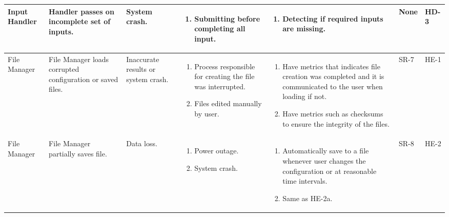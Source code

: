 \documentclass{article}
\begin{document}
\begin{landscape}
\begin{longtable}{|p{} | p{} | p{} | p{} | p{} | p{} | p{}|}
  \hline

  Input Handler & Handler passes on incomplete set of inputs. & System crash. &
  \begin{enumerate}[leftmargin=*, label={\alph*.}, itemsep=1pt, topsep=0pt, partopsep=0pt] 
    \item Submitting before completing all input.
  \end{enumerate} &
  \begin{enumerate}[leftmargin=*, label={\alph*.}, itemsep=1pt, topsep=0pt, partopsep=0pt] 
    \item Detecting if required inputs are missing.
  \end{enumerate} &
  None & HD-3 \\

  \hline

  File Manager & File Manager loads corrupted configuration or saved files. &
  Inaccurate results or system crash. &
  \begin{enumerate}[leftmargin=*, label={\alph*.}, itemsep=1pt, topsep=0pt, partopsep=0pt] 
    \item Process responsible for creating the file was interrupted.
    \item Files edited manually by user.
  \end{enumerate} &
  \begin{enumerate}[leftmargin=*, label={\alph*.}, itemsep=1pt, topsep=0pt, partopsep=0pt] 
    \item Have metrics that indicates file creation was completed and it is communicated to the user when loading if 
    not.
    \item Have metrics such as checksums to ensure the integrity of the files.  
  \end{enumerate} &
  SR-7 & HE-1 \\

  \hline

  File Manager & File Manager partially saves file. & Data loss. &
  \begin{enumerate}[leftmargin=*, label={\alph*.}, itemsep=1pt, topsep=0pt, partopsep=0pt] 
    \item Power outage.
    \item System crash.     
  \end{enumerate} &
  \begin{enumerate}[leftmargin=*, label={\alph*.}, itemsep=1pt, topsep=0pt, partopsep=0pt] 
    \item Automatically save to a file whenever user changes the configuration or at reasonable time intervals.
    \item Same as HE-2a.
  \end{enumerate} & 
  SR-8 & HE-2 \\
  \hline
\end{longtable}
\end{landscape}
\end{document}
